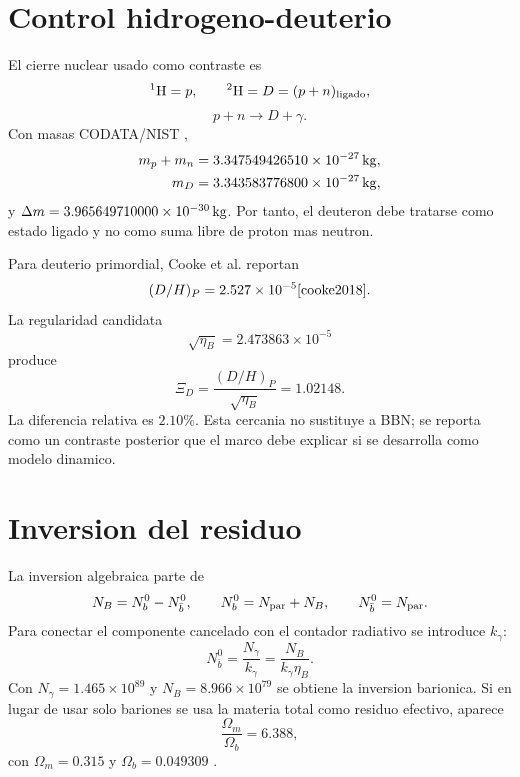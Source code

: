 \documentclass[10pt,twocolumn]{article}
\begin{document}
\section{Control hidrogeno-deuterio}

El cierre nuclear usado como contraste es
\begin{equation}
^1{\rm H}=p,\qquad ^2{\rm H}=D=(p+n)_{\rm ligado},
\end{equation}
\begin{equation}
p+n\rightarrow D+\gamma.
\end{equation}
Con masas CODATA/NIST \cite{nist_codata_2022},
\begin{align}
m_p+m_n &=3.347549426510\times10^{-27}{\rm\,kg},\\
m_D &=3.343583776800\times10^{-27}{\rm\,kg},
\end{align}
y $\Delta m=3.965649710000\times10^{-30}{\rm\,kg}$. Por tanto, el deuteron debe tratarse como estado ligado y no como suma libre de proton mas neutron.

Para deuterio primordial, Cooke et al. reportan
\begin{equation}
(D/H)_P=2.527\times10^{-5}\cite{cooke2018}.
\end{equation}
La regularidad candidata
\begin{equation}
\sqrt{\eta_B}=2.473863\times10^{-5}
\end{equation}
produce
\begin{equation}
\Xi_D=\frac{(D/H)_P}{\sqrt{\eta_B}}=1.02148.
\end{equation}
La diferencia relativa es $2.10\%$. Esta cercania no sustituye a BBN; se reporta como un contraste posterior que el marco debe explicar si se desarrolla como modelo dinamico.

\section{Inversion del residuo}

La inversion algebraica parte de
\begin{equation}
N_B=N_b^0-N_{\bar b}^0,\qquad
N_b^0=N_{\rm par}+N_B,\qquad
N_{\bar b}^0=N_{\rm par}.
\end{equation}
Para conectar el componente cancelado con el contador radiativo se introduce $k_\gamma$:
\begin{equation}
N_{\bar b}^0=\frac{N_\gamma}{k_\gamma}
=\frac{N_B}{k_\gamma\eta_B}.
\end{equation}
Con $N_\gamma=1.465\times10^{89}$ y $N_B=8.966\times10^{79}$ se obtiene la inversion barionica. Si en lugar de usar solo bariones se usa la materia total como residuo efectivo, aparece
\begin{equation}
\frac{\Omega_m}{\Omega_b}=6.388,
\end{equation}
con $\Omega_m=0.315$ y $\Omega_b=0.049309$ \cite{planck2018params}.
\end{document}
